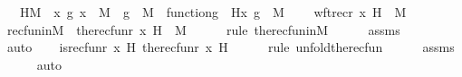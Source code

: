 \begin{isabellebody}
\ \ \ HM\ {\isacharcolon}{\kern0pt}\ {\isachardoublequoteopen}{\isacharparenleft}{\kern0pt}{\isasymAnd}x\ g{\isachardot}{\kern0pt}\ x\ {\isasymin}\ M\ {\isasymLongrightarrow}\ g\ {\isasymin}\ M\ {\isasymLongrightarrow}\ function{\isacharparenleft}{\kern0pt}g{\isacharparenright}{\kern0pt}\ {\isasymLongrightarrow}\ H{\isacharparenleft}{\kern0pt}x{\isacharcomma}{\kern0pt}\ g{\isacharparenright}{\kern0pt}\ {\isasymin}\ M{\isacharparenright}{\kern0pt}{\isachardoublequoteclose}\ \isanewline
\ \ \ {\isachardoublequoteopen}wftrec{\isacharparenleft}{\kern0pt}r{\isacharcomma}{\kern0pt}\ x{\isacharcomma}{\kern0pt}\ H{\isacharparenright}{\kern0pt}\ {\isasymin}\ M{\isachardoublequoteclose}\ \isanewline
%
\isadelimproof
%
\endisadelimproof
%
\isatagproof
{}\isamarkupfalse%
\ {\isacharminus}{\kern0pt}\ \isanewline
\ \ \isamarkupfalse%
\ recfuninM\ {\isacharcolon}{\kern0pt}\ {\isachardoublequoteopen}the{\isacharunderscore}{\kern0pt}recfun{\isacharparenleft}{\kern0pt}r{\isacharcomma}{\kern0pt}\ x{\isacharcomma}{\kern0pt}\ H{\isacharparenright}{\kern0pt}\ {\isasymin}\ M{\isachardoublequoteclose}\ \isanewline
\ \ \ \ \isamarkupfalse%
{\isacharparenleft}{\kern0pt}rule\ the{\isacharunderscore}{\kern0pt}recfun{\isacharunderscore}{\kern0pt}in{\isacharunderscore}{\kern0pt}M{\isacharparenright}{\kern0pt}\isanewline
\ \ \ \ \isamarkupfalse%
\ assms\ \isanewline
\ \ \ \ \isamarkupfalse%
\ auto\isanewline
\isanewline
\ \ \isamarkupfalse%
\ {\isachardoublequoteopen}is{\isacharunderscore}{\kern0pt}recfun{\isacharparenleft}{\kern0pt}r{\isacharcomma}{\kern0pt}\ x{\isacharcomma}{\kern0pt}\ H{\isacharcomma}{\kern0pt}\ the{\isacharunderscore}{\kern0pt}recfun{\isacharparenleft}{\kern0pt}r{\isacharcomma}{\kern0pt}\ x{\isacharcomma}{\kern0pt}\ H{\isacharparenright}{\kern0pt}{\isacharparenright}{\kern0pt}{\isachardoublequoteclose}\ \isanewline
\ \ \ \ \isamarkupfalse%
{\isacharparenleft}{\kern0pt}rule\ unfold{\isacharunderscore}{\kern0pt}the{\isacharunderscore}{\kern0pt}recfun{\isacharparenright}{\kern0pt}\isanewline
\ \ \ \ \isamarkupfalse%
\ assms\isanewline
\ \ \ \ \isamarkupfalse%
\ auto\isanewline
\ \ \isamarkupfalse%
\ \isamarkupfalse%

\end{isabellebody}
